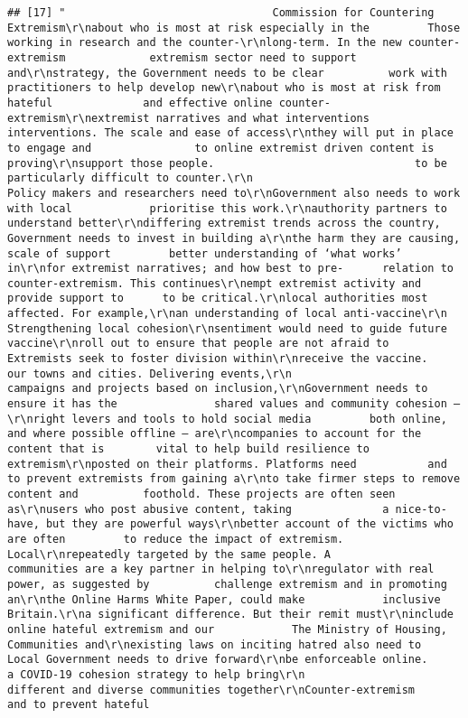 \documentclass[
]{book}
\begin{document}
\begin{verbatim}
## [17] "                                Commission for Countering Extremism\r\nabout who is most at risk especially in the         Those working in research and the counter-\r\nlong-term. In the new counter-extremism             extremism sector need to support and\r\nstrategy, the Government needs to be clear          work with practitioners to help develop new\r\nabout who is most at risk from hateful              and effective online counter-extremism\r\nextremist narratives and what interventions         interventions. The scale and ease of access\r\nthey will put in place to engage and                to online extremist driven content is proving\r\nsupport those people.                               to be particularly difficult to counter.\r\n                                                    Policy makers and researchers need to\r\nGovernment also needs to work with local            prioritise this work.\r\nauthority partners to understand better\r\ndiffering extremist trends across the country,      Government needs to invest in building a\r\nthe harm they are causing, scale of support         better understanding of ‘what works’ in\r\nfor extremist narratives; and how best to pre-      relation to counter-extremism. This continues\r\nempt extremist activity and provide support to      to be critical.\r\nlocal authorities most affected. For example,\r\nan understanding of local anti-vaccine\r\n                                                    Strengthening local cohesion\r\nsentiment would need to guide future vaccine\r\nroll out to ensure that people are not afraid to    Extremists seek to foster division within\r\nreceive the vaccine.                                our towns and cities. Delivering events,\r\n                                                    campaigns and projects based on inclusion,\r\nGovernment needs to ensure it has the               shared values and community cohesion –\r\nright levers and tools to hold social media         both online, and where possible offline – are\r\ncompanies to account for the content that is        vital to help build resilience to extremism\r\nposted on their platforms. Platforms need           and to prevent extremists from gaining a\r\nto take firmer steps to remove content and          foothold. These projects are often seen as\r\nusers who post abusive content, taking              a nice-to-have, but they are powerful ways\r\nbetter account of the victims who are often         to reduce the impact of extremism. Local\r\nrepeatedly targeted by the same people. A           communities are a key partner in helping to\r\nregulator with real power, as suggested by          challenge extremism and in promoting an\r\nthe Online Harms White Paper, could make            inclusive Britain.\r\na significant difference. But their remit must\r\ninclude online hateful extremism and our            The Ministry of Housing, Communities and\r\nexisting laws on inciting hatred also need to       Local Government needs to drive forward\r\nbe enforceable online.                              a COVID-19 cohesion strategy to help bring\r\n                                                    different and diverse communities together\r\nCounter-extremism                                   and to prevent hateful 
\end{verbatim}
\end{document}
